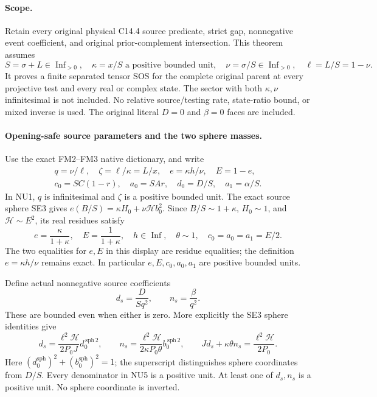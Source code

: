 \label{p578719565e9d:sec:new-c144-nu-endpoint}

\paragraph{Scope.}
Retain every original physical C14.4 source predicate, strict gap,
nonnegative event coefficient, and original prior-complement intersection.
This theorem assumes
\[
 S=\sigma+L\in\operatorname{Inf}_{>0},\quad
 \kappa=x/S\text{ a positive bounded unit},\quad
 \nu=\sigma/S\in\operatorname{Inf}_{>0},\quad\ell=L/S=1-\nu.
 \tag{NU1}
\]
It proves a finite separated tensor SOS for the complete original
parent at every projective test and every real or complex state.
The sector with both $\kappa,\nu$ infinitesimal is not included.
No relative source/testing rate, state-ratio bound, or mixed inverse
is used. The original literal $D=0$ and $\beta=0$ faces are included.

\paragraph{Opening-safe source parameters and the two sphere masses.}
Use the exact FM2--FM3 native dictionary, and write
\[
\begin{gathered}
 q=\nu/\ell,\quad \zeta=\ell/\kappa=L/x,\quad
 e=\kappa h/\nu,\quad E=1-e,\\
 c_0=SC(1-r),\quad a_0=SAr,\quad d_0=D/S,\quad a_1=\alpha/S.
\end{gathered}
 \tag{NU2}
\]
In NU1, $q$ is infinitesimal and $\zeta$ is a positive bounded
unit. The exact source sphere SE3 gives
$e(B/S)=\kappa H_0+\nu\mathcal H b_0^2$.
Since $B/S\sim1+\kappa$, $H_0\sim1$, and
$\mathcal H\sim E^2$, its real residues satisfy
\[
 e=\frac\kappa{1+\kappa},\quad E=\frac1{1+\kappa},\quad
 h\in\operatorname{Inf},\quad\theta\sim1,\quad
 c_0=a_0=a_1=E/2.
 \tag{NU3}
\]
The two equalities for $e,E$ in this display are residue
equalities; the definition $e=\kappa h/\nu$ remains exact.
In particular $e,E,c_0,a_0,a_1$ are positive bounded units.

Define actual nonnegative source coefficients
\[
 d_s=\frac{D}{Sq^2},\qquad n_s=\frac\beta{q^2}.
 \tag{NU4}
\]
These are bounded even when either is zero. More explicitly the
SE3 sphere identities give
\[
 d_s=\frac{\ell^2\mathcal H}{2P_0J}d_0^{\,\mathrm{sph}\,2},
 \qquad
 n_s=\frac{\ell^2\mathcal H}{2\kappa P_0\theta}
                                   b_0^{\,\mathrm{sph}\,2},
 \qquad
 Jd_s+\kappa\theta n_s=\frac{\ell^2\mathcal H}{2P_0}.
 \tag{NU5}
\]
Here $(d_0^{\mathrm{sph}})^2+(b_0^{\mathrm{sph}})^2=1$;
the superscript distinguishes sphere coordinates from $D/S$.
Every denominator in NU5 is a positive unit. At least one of
$d_s,n_s$ is a positive unit. No sphere coordinate is inverted.

